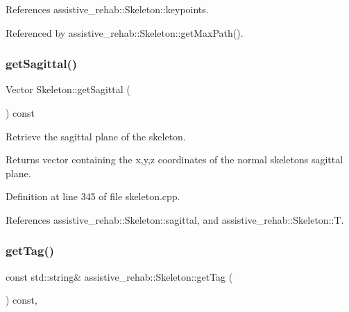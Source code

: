References assistive\+\_\+rehab\+::\+Skeleton\+::keypoints.



Referenced by assistive\+\_\+rehab\+::\+Skeleton\+::get\+Max\+Path().

\mbox{\label{classassistive__rehab_1_1Skeleton_a83133fabc903ddd4e54edf59df977167}} 
\subsubsection{\texorpdfstring{getSagittal()}{getSagittal()}}
{\footnotesize\ttfamily Vector Skeleton\+::get\+Sagittal (\begin{DoxyParamCaption}{ }\end{DoxyParamCaption}) const\hspace{0.3cm}{\ttfamily [inherited]}}



Retrieve the sagittal plane of the skeleton. 

\begin{DoxyReturn}{Returns}
vector containing the x,y,z coordinates of the normal skeleton\textquotesingle{}s sagittal plane. 
\end{DoxyReturn}


Definition at line 345 of file skeleton.\+cpp.


\begin{DoxyCode}{0}

\end{DoxyCode}


References assistive\+\_\+rehab\+::\+Skeleton\+::sagittal, and assistive\+\_\+rehab\+::\+Skeleton\+::T.

\mbox{\label{classassistive__rehab_1_1Skeleton_a185654045d5e43b3853cdb8fdd676da6}} 
\subsubsection{\texorpdfstring{getTag()}{getTag()}}
{\footnotesize\ttfamily const std\+::string\& assistive\+\_\+rehab\+::\+Skeleton\+::get\+Tag (\begin{DoxyParamCaption}{ }\end{DoxyParamCaption}) const\hspace{0.3cm}{\ttfamily [inline]}, {\ttfamily [inherited]}}



